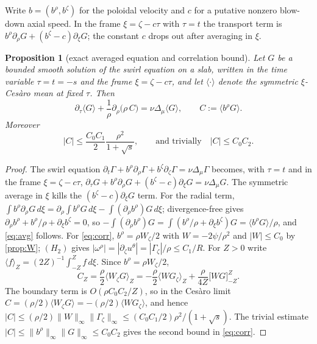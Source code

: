 \documentclass[11pt]{article}
\newtheorem{proposition}[theorem]{Proposition}
\theoremstyle{definition}
\begin{document}
Write $b=(b^\rho,b^\zeta)$ for the poloidal velocity and $c$ for a putative
nonzero blow-down axial speed. In the frame $\xi=\zeta-c\tau$ with $\tau=t$
the transport term is $b^\rho\partial_\rho G+(b^\zeta-c)\partial_\xi G$; the
constant $c$ drops out after averaging in $\xi$.

\begin{proposition}[exact averaged equation and correlation bound]
\label{prop:average}
Let $G$ be a bounded smooth solution of the swirl equation on a slab, written
in the time variable $\tau=t=-s$ and the frame $\xi=\zeta-c\tau$, and let
$\langle\cdot\rangle$ denote the symmetric $\xi$-Ces\`aro mean at fixed
$\tau$. Then
\begin{equation}\label{eq:avg}
\partial_\tau\langle G\rangle
+\frac1\rho\partial_\rho\bigl(\rho\,C\bigr)
=\nu\Delta_\mu\langle G\rangle,
\qquad C:=\langle b^\rho G\rangle .
\end{equation}
Moreover
\begin{equation}\label{eq:corr}
|C|\le\frac{C_0C_1}{2}\frac{\rho^2}{1+\sqrt s},
\qquad\text{and trivially}\quad |C|\le C_0C_2 .
\end{equation}
\end{proposition}
\begin{proof}
The swirl equation
$\partial_t\Gamma+b^\rho\partial_\rho\Gamma+b^\zeta\partial_\zeta\Gamma
=\nu\Delta_\mu\Gamma$ becomes, with $\tau=t$ and in the frame
$\xi=\zeta-c\tau$,
$\partial_\tau G+b^\rho\partial_\rho G+(b^\zeta-c)\partial_\xi G
=\nu\Delta_\mu G$. The symmetric average in $\xi$ kills the
$(b^\zeta-c)\partial_\xi G$ term. For the radial term,
$\int b^\rho\partial_\rho G\,d\xi
=\partial_\rho\int b^\rho G\,d\xi-\int(\partial_\rho b^\rho)G\,d\xi$;
divergence-free gives
$\partial_\rho b^\rho+b^\rho/\rho+\partial_\xi b^\zeta=0$, so
$-\int(\partial_\rho b^\rho)G=\int(b^\rho/\rho+\partial_\xi b^\zeta)G
=\langle b^\rho G\rangle/\rho$, and \eqref{eq:avg} follows. For
\eqref{eq:corr}, $b^\rho=\rho W_\zeta/2$ with $W=-2\psi/\rho^2$ and
$|W|\le C_0$ by \cref{prop:W}; $(H_2)$ gives
$|\omega^\rho|=|\partial_\zeta u^\theta|=|\Gamma_\zeta|/\rho\le C_1/R$.
For $Z>0$ write $\langle f\rangle_Z=(2Z)^{-1}\int_{-Z}^Zf\,d\xi$. Since
$b^\rho=\rho W_\zeta/2$,
\begin{equation}
C_Z=\frac{\rho}{2}\langle W_\zeta G\rangle_Z
=-\frac{\rho}{2}\langle WG_\zeta\rangle_Z
+\frac{\rho}{4Z}\bigl[WG\bigr]_{-Z}^{Z}.
\end{equation}
The boundary term is $O(\rho C_0C_2/Z)$, so in the Ces\`aro limit
$C=(\rho/2)\langle W_\zeta G\rangle=-(\rho/2)\langle WG_\zeta\rangle$, and
hence
$|C|\le(\rho/2)\|W\|_\infty\|\Gamma_\zeta\|_\infty\le
(C_0C_1/2)\rho^2/(1+\sqrt s)$. The trivial estimate
$|C|\le\|b^\rho\|_\infty\|G\|_\infty\le C_0C_2$ gives the second bound in
\eqref{eq:corr}.
\end{proof}
\end{document}
